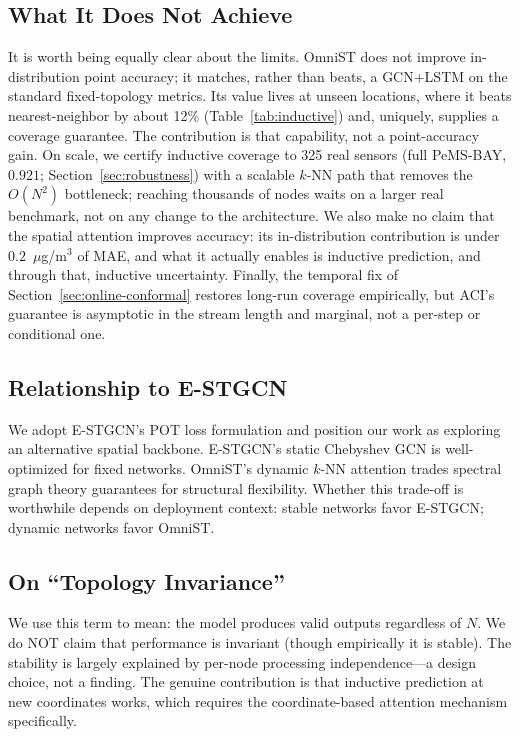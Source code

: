 \documentclass[journal]{IEEEtran}
\begin{document}
\subsection{What It Does Not Achieve}

It is worth being equally clear about the limits. OmniST does not improve in-distribution point
accuracy; it matches, rather than beats, a GCN+LSTM on the standard fixed-topology metrics. Its value
lives at unseen locations, where it beats nearest-neighbor by about 12\% (Table~\ref{tab:inductive})
and, uniquely, supplies a coverage guarantee. The contribution is that capability, not a point-accuracy
gain. On scale, we certify inductive coverage to 325 real sensors (full PeMS-BAY, $0.921$;
Section~\ref{sec:robustness}) with a scalable $k$-NN path that removes the $O(N^2)$ bottleneck;
reaching thousands of nodes waits on a larger real benchmark, not on any change to the architecture.
We also make no claim that the spatial attention improves accuracy: its in-distribution contribution
is under $0.2$~$\mu$g/m$^3$ of MAE, and what it actually enables is inductive prediction, and through
that, inductive uncertainty. Finally, the temporal fix of Section~\ref{sec:online-conformal} restores
long-run coverage empirically, but ACI's guarantee is asymptotic in the stream length and marginal,
not a per-step or conditional one.

\subsection{Relationship to E-STGCN}

We adopt E-STGCN's POT loss formulation \cite{panja2026estgcn} and position our work as exploring an alternative spatial backbone. E-STGCN's static Chebyshev GCN is well-optimized for fixed networks. OmniST's dynamic $k$-NN attention trades spectral graph theory guarantees for structural flexibility. Whether this trade-off is worthwhile depends on deployment context: stable networks favor E-STGCN; dynamic networks favor OmniST.

\subsection{On ``Topology Invariance''}

We use this term to mean: the model produces valid outputs regardless of $N$. We do NOT claim that performance is invariant (though empirically it is stable). The stability is largely explained by per-node processing independence---a design choice, not a finding. The genuine contribution is that inductive prediction at new coordinates works, which requires the coordinate-based attention mechanism specifically.
\end{document}
